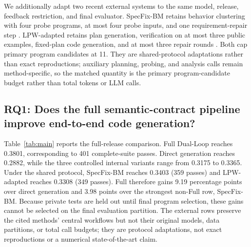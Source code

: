 \documentclass{article}
\begin{document}
We additionally adapt two recent external systems to the same model, release, feedback restriction, and final evaluator. SpecFix-BM retains behavior clustering with four probe programs, at most four probe inputs, and one requirement-repair step \citep{ref_specfix}. LPW-adapted retains plan generation, verification on at most three public examples, fixed-plan code generation, and at most three repair rounds \citep{ref_planning_driven_programming}. Both cap primary program candidates at 11. They are shared-protocol adaptations rather than exact reproductions; auxiliary planning, probing, and analysis calls remain method-specific, so the matched quantity is the primary program-candidate budget rather than total tokens or LLM calls.

\subsection{RQ1: Does the full semantic-contract pipeline improve end-to-end code generation?}

Table~\ref{tab:main} reports the full-release comparison. Full Dual-Loop reaches 0.3801, corresponding to 401 complete-suite passes. Direct generation reaches 0.2882, while the three controlled internal variants range from 0.3175 to 0.3365. Under the shared protocol, SpecFix-BM reaches 0.3403 (359 passes) and LPW-adapted reaches 0.3308 (349 passes). Full therefore gains 9.19 percentage points over direct generation and 3.98 points over the strongest non-Full row, SpecFix-BM. Because private tests are held out until final program selection, these gains cannot be selected on the final evaluation partition. The external rows preserve the cited methods' central workflows but not their original models, data partitions, or total call budgets; they are protocol adaptations, not exact reproductions or a numerical state-of-the-art claim.
\end{document}
